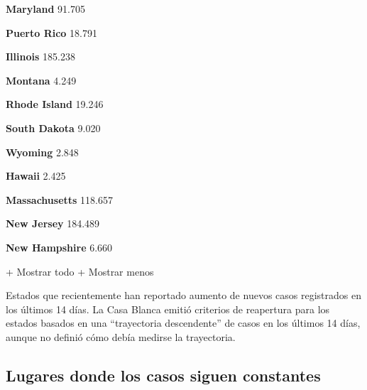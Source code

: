 \href{https://www.nytimes.com/interactive/2020/us/maryland-coronavirus-cases.html}{}

\textbf{Maryland} 91.705

\href{https://www.nytimes.com/interactive/2020/us/puerto-rico-coronavirus-cases.html}{}

\textbf{Puerto Rico} 18.791

\href{https://www.nytimes.com/interactive/2020/us/illinois-coronavirus-cases.html}{}

\textbf{Illinois} 185.238

\href{https://www.nytimes.com/interactive/2020/us/montana-coronavirus-cases.html}{}

\textbf{Montana} 4.249

\href{https://www.nytimes.com/interactive/2020/us/rhode-island-coronavirus-cases.html}{}

\textbf{Rhode Island} 19.246

\href{https://www.nytimes.com/interactive/2020/us/south-dakota-coronavirus-cases.html}{}

\textbf{South Dakota} 9.020

\href{https://www.nytimes.com/interactive/2020/us/wyoming-coronavirus-cases.html}{}

\textbf{Wyoming} 2.848

\href{https://www.nytimes.com/interactive/2020/us/hawaii-coronavirus-cases.html}{}

\textbf{Hawaii} 2.425

\href{https://www.nytimes.com/interactive/2020/us/massachusetts-coronavirus-cases.html}{}

\textbf{Massachusetts} 118.657

\href{https://www.nytimes.com/interactive/2020/us/new-jersey-coronavirus-cases.html}{}

\textbf{New Jersey} 184.489

\href{https://www.nytimes.com/interactive/2020/us/new-hampshire-coronavirus-cases.html}{}

\textbf{New Hampshire} 6.660

+ Mostrar todo + Mostrar menos

Estados que recientemente han reportado aumento de nuevos casos
registrados en los últimos 14 días. La Casa Blanca emitió criterios de
reapertura para los estados basados en una ``trayectoria descendente''
de casos en los últimos 14 días, aunque no definió cómo debía medirse la
trayectoria.

\hypertarget{lugares-donde-los-casos-siguen-constantes}{%
\subsection{Lugares donde los casos siguen
constantes}\label{lugares-donde-los-casos-siguen-constantes}}


